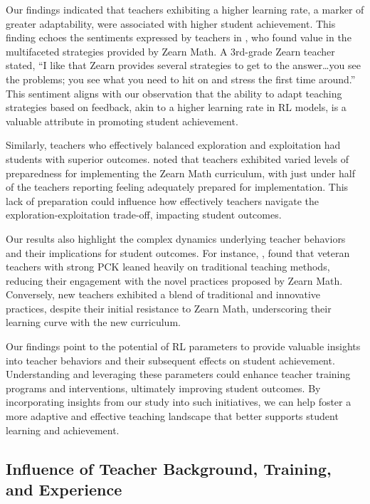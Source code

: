 \documentclass[
  number,
  preprint,
  3p,
  onecolumn]{elsarticle}
\begin{document}
Our findings indicated that teachers exhibiting a higher learning rate,
a marker of greater adaptability, were associated with higher student
achievement. This finding echoes the sentiments expressed by teachers in
\citep{knudsen2020}, who found value in the multifaceted strategies
provided by Zearn Math. A 3rd-grade Zearn teacher stated, ``I like that
Zearn provides several strategies to get to the answer\ldots you see the
problems; you see what you need to hit on and stress the first time
around.'' This sentiment aligns with our observation that the ability to
adapt teaching strategies based on feedback, akin to a higher learning
rate in RL models, is a valuable attribute in promoting student
achievement.

Similarly, teachers who effectively balanced exploration and
exploitation had students with superior outcomes. \citep{morrison2019}
noted that teachers exhibited varied levels of preparedness for
implementing the Zearn Math curriculum, with just under half of the
teachers reporting feeling adequately prepared for implementation. This
lack of preparation could influence how effectively teachers navigate
the exploration-exploitation trade-off, impacting student outcomes.

Our results also highlight the complex dynamics underlying teacher
behaviors and their implications for student outcomes. For instance,
\citep{knudsen2020}, found that veteran teachers with strong PCK leaned
heavily on traditional teaching methods, reducing their engagement with
the novel practices proposed by Zearn Math. Conversely, new teachers
exhibited a blend of traditional and innovative practices, despite their
initial resistance to Zearn Math, underscoring their learning curve with
the new curriculum.

Our findings point to the potential of RL parameters to provide valuable
insights into teacher behaviors and their subsequent effects on student
achievement. Understanding and leveraging these parameters could enhance
teacher training programs and interventions, ultimately improving
student outcomes. By incorporating insights from our study into such
initiatives, we can help foster a more adaptive and effective teaching
landscape that better supports student learning and achievement.

\hypertarget{influence-of-teacher-background-training-and-experience}{%
\subsection{Influence of Teacher Background, Training, and
Experience}\label{influence-of-teacher-background-training-and-experience}}
\end{document}
